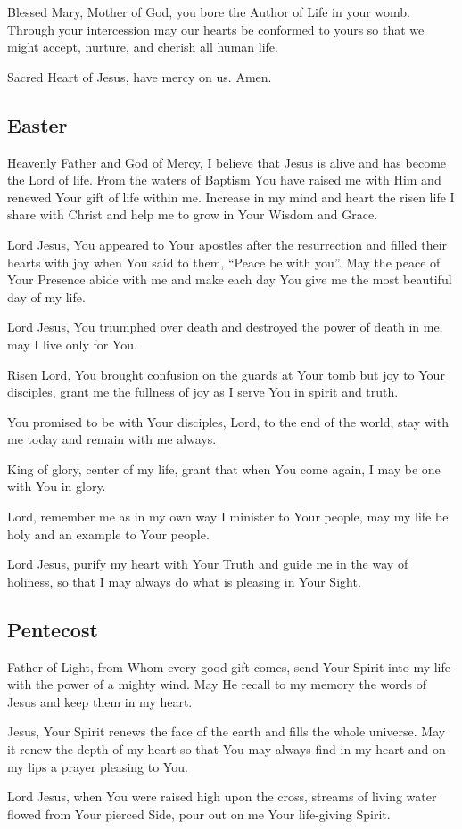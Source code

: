 \documentclass[12pt]{article}
\newcommand{\prayertitle}[1]{\subsection{#1}}
\begin{document}
Blessed Mary, Mother of God, you bore the Author of Life in your womb. 
Through your intercession may our hearts be conformed to yours so that we might accept, nurture, and cherish all human life.

Sacred Heart of Jesus, have mercy on us. Amen.

\prayertitle{Easter}
Heavenly Father and God of Mercy, I believe that Jesus is alive and has become the Lord of life.
From the waters of Baptism You have raised me with Him and renewed Your gift of life within me.
Increase in my mind and heart the risen life I share with Christ and help me to grow in Your Wisdom and Grace.

Lord Jesus, You appeared to Your apostles after the resurrection and filled their hearts with joy when You said to them, ``Peace be with you''.
May the peace of Your Presence abide with me and make each day You give me the most beautiful day of my life.

Lord Jesus, You triumphed over death and destroyed the power of death in me, may I live only for You.

Risen Lord, You brought confusion on the guards at Your tomb but joy to Your disciples, grant me the fullness of joy as I serve You in spirit and truth.

You promised to be with Your disciples, Lord, to the end of the world, stay with me today and remain with me always.

King of glory, center of my life, grant that when You come again, I may be one with You in glory.

Lord, remember me as in my own way I minister to Your people, may my life be holy and an example to Your people.

Lord Jesus, purify my heart with Your Truth and guide me in the way of holiness, so that I may always do what is pleasing in Your Sight.

\prayertitle{Pentecost}
Father of Light, from Whom every good gift comes, send Your Spirit into my life with the power of a mighty wind.
May He recall to my memory the words of Jesus and keep them in my heart.

Jesus, Your Spirit renews the face of the earth and fills the whole universe.
May it renew the depth of my heart so that You may always find in my heart and on my lips a prayer pleasing to You.

Lord Jesus, when You were raised high upon the cross, streams of living water flowed from Your pierced Side, pour out on me Your life-giving Spirit.
\end{document}

